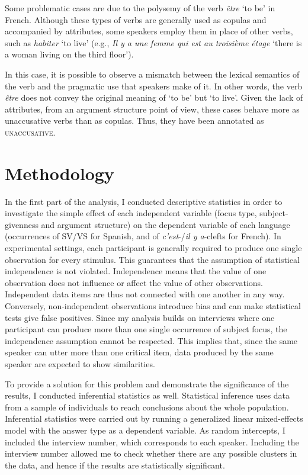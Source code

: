 Some problematic cases are due to the polysemy of the verb \textit{être} `to be' in French. Although these types of verbs are generally used as copulas and accompanied by attributes, some speakers employ them in place of other verbs, such as \textit{habiter} `to live' (e.g., 
\textit{Il y a une femme qui est au troisième étage} `there is a woman living on the third floor').

In this case, it is possible to observe a mismatch between the lexical semantics of the verb and the pragmatic use that speakers make of it. In other words, the verb \textit{être} does not convey the original meaning of `to be' but `to live'. Given the lack of attributes, from an argument structure point of view, these cases behave more as unaccusative verbs than as copulas. Thus, they have been annotated as \textsc{unaccusative}.


\section{Methodology} \label{sub:6.5}

In the first part of the analysis, I conducted descriptive statistics in order to investigate the simple effect of each independent variable (focus type, subject-givenness and argument structure) on the dependent variable of each language (occurrences of SV/VS for Spanish, and of \textit{c'est}-/\textit{il y a}-clefts for French).
In experimental settings, each participant is generally required to produce one single observation for every stimulus. This guarantees that the assumption of statistical independence is not violated. Independence means that the value of one observation does not influence or affect the value of other observations. Independent data items are thus not connected with one another in any way. Conversely,  non-independent observations introduce bias and can make statistical tests give false positives. Since my analysis builds on interviews where one participant can produce more than one single occurrence of subject focus, the independence assumption cannot be respected. This implies that, since the same speaker can utter more than one critical item, data produced by the same speaker are expected to show similarities.

To provide a solution for this problem and demonstrate the significance of the results, I conducted inferential statistics as well. Statistical inference uses data from a sample of individuals to reach conclusions about the whole population. Inferential statistics were carried out by running a generalized linear mixed-effects model with the answer type as a dependent variable. As random intercepts, I included the interview number, which corresponds to each speaker. Including the interview number allowed me to check whether there are any possible clusters in the data, and hence if the results are statistically significant.

